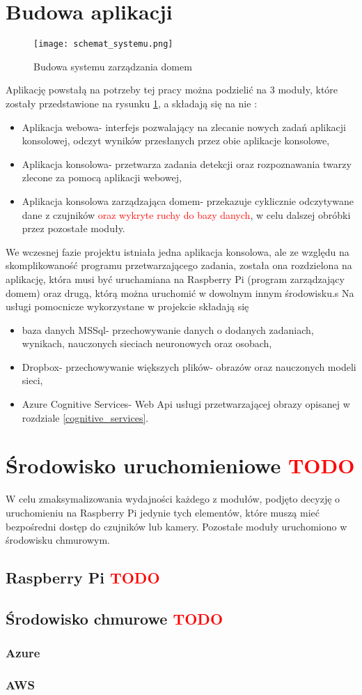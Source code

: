 \section{Budowa aplikacji}
\begin{figure}[H]
	\centering
	\texttt{[image: schemat\_systemu.png]}
	\caption{Budowa systemu zarządzania domem}
	\label{fig:schemat_systemu}
\end{figure}
Aplikację powstałą na potrzeby tej pracy można podzielić na 3 moduły, które zostały przedstawione na rysunku \ref{fig:schemat_systemu}, a składają się na nie :
\begin{itemize}
\item Aplikacja webowa- interfejs pozwalający na zlecanie nowych zadań aplikacji konsolowej, odczyt wyników przesłanych przez obie aplikacje konsolowe,
\item Aplikacja konsolowa- przetwarza zadania detekcji oraz rozpoznawania twarzy zlecone za pomocą aplikacji webowej,
\item Aplikacja konsolowa zarządzająca domem- przekazuje cyklicznie odczytywane dane z czujników \textcolor{red}{oraz wykryte ruchy do bazy danych}, w celu dalszej obróbki przez pozostałe moduły.
\end{itemize}
We wczesnej fazie projektu istniała jedna aplikacja konsolowa, ale ze względu na skomplikowaność programu przetwarzającego zadania, została ona rozdzielona na aplikację, która musi być uruchamiana na Raspberry Pi (program zarządzający domem) oraz drugą, którą można uruchomić w dowolnym innym środowisku.s
Na usługi pomocnicze wykorzystane w projekcie składają się
\begin{itemize}
\item baza danych MSSql- przechowywanie danych o dodanych zadaniach, wynikach, nauczonych sieciach neuronowych oraz osobach,
\item Dropbox- przechowywanie większych plików- obrazów oraz nauczonych modeli sieci,
\item Azure Cognitive Services- Web Api usługi przetwarzającej obrazy opisanej w rozdziale \ref{cognitive_services}.
\end{itemize}

\section{Środowisko uruchomieniowe \textcolor{red}{TODO}}
W celu zmaksymalizowania wydajności każdego z modułów, podjęto decyzję o uruchomieniu na Raspberry Pi jedynie tych elementów, które muszą mieć bezpośredni dostęp do czujników lub kamery. Pozostałe moduły uruchomiono w środowisku chmurowym.
\subsection{Raspberry Pi \textcolor{red}{TODO}}


\subsection{Środowisko chmurowe \textcolor{red}{TODO}}
\subsubsection{Azure}
\subsubsection{AWS}